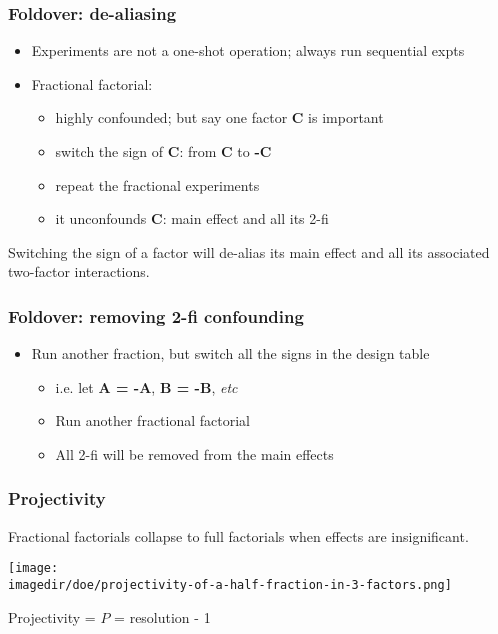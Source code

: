 \begin{frame}\frametitle{Foldover: de-aliasing}
	\begin{itemize}
		\item	Experiments are not a one-shot operation; always run sequential expts
		\item	Fractional factorial:
		\begin{itemize}
			\item	highly confounded; but say one factor \textbf{C} is important
			\item	switch the sign of \textbf{C}: from \textbf{C} to \textbf{-C}
			\item	repeat the fractional experiments
			\item	it unconfounds \textbf{C}: main effect and all its 2-fi
		\end{itemize}
	\end{itemize}

	Switching the sign of a factor will de-alias its main effect and all its associated two-factor interactions.
\end{frame}

\begin{frame}\frametitle{Foldover: removing 2-fi confounding}
	\begin{itemize}
		\item	Run another fraction, but switch all the signs in the design table
		\begin{itemize}
			\item	i.e. let \textbf{A = -A}, \textbf{B = -B}, \emph{etc}
			\item	Run another fractional factorial
			\item	All 2-fi will be removed from the main effects
		\end{itemize}
	\end{itemize}
\end{frame}

\begin{frame}\frametitle{Projectivity}

	Fractional factorials collapse to full factorials when effects are insignificant.
	\begin{center}
		\texttt{[image: \\imagedir/doe/projectivity-of-a-half-fraction-in-3-factors.png]}
	\end{center}
	Projectivity = $P$ = resolution - 1
\end{frame}

